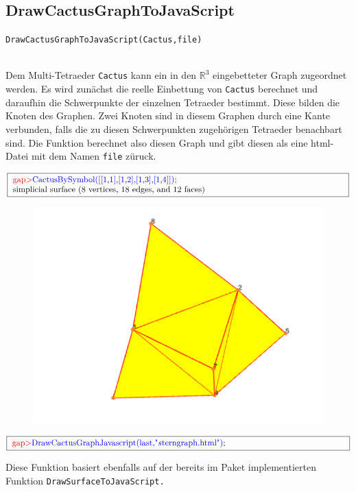 \documentclass[12pt,titlepage,twoside,cleardoublepage]{article}
\theoremstyle{nummermitklammern}
\numberwithin{equation}{section}
\begin{document}
\subsection{DrawCactusGraphToJavaScript}
\begin{large}
\texttt{DrawCactusGraphToJavaScript(Cactus,file)}
\end{large}\\
Dem Multi-Tetraeder \texttt{Cactus} kann ein in den $\mathbb{R}^3$ eingebetteter Graph zugeordnet werden. Es wird zunächst die reelle Einbettung von \texttt{Cactus} berechnet und daraufhin die Schwerpunkte der einzelnen Tetraeder bestimmt. Diese bilden die Knoten des Graphen. Zwei Knoten sind in diesem Graphen durch eine Kante verbunden, falls die zu diesen Schwerpunkten zugehörigen Tetraeder benachbart sind.
Die Funktion berechnet also diesen Graph und gibt diesen als eine html-Datei mit dem Namen \texttt{file} züruck.
\begin{center} 
$\fbox{
\parbox{14cm}{
\textcolor{red}{gap$>$}\textcolor{blue}{ CactusBySymbol([[1,1],[1,2],[1,3],[1,4]]);}\newline
simplicial surface (8 vertices, 18 edges, and 12 faces)
}}$
 \begin{figure}[H]
\begin{center}
\includegraphics[scale=0.5,viewport=0cm 1.5cm 18cm 13cm]{stern2}
\end{center}
\end{figure}
$\fbox{
\parbox{14cm}{
\textcolor{red}{gap$>$}\textcolor{blue}{DrawCactusGraphJavascript(last,"$s$terngraph.html")};
}
}$
\end{center}
Diese Funktion basiert ebenfalls auf der bereits im Paket implementierten Funktion \texttt{DrawSurfaceToJavaScript.}
\end{document}
